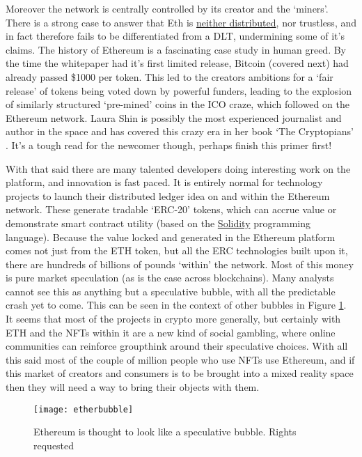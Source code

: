 Moreover the network is centrally controlled by its creator and the `miners'. There is a strong case to answer that Eth is \href{https://blog.mollywhite.net/blockchains-are-not-what-they-say/}{neither distributed}, nor trustless, and in fact therefore fails to be differentiated from a DLT, undermining some of it's claims. The history of Ethereum is a fascinating case study in human greed. By the time the whitepaper had it's first limited release, Bitcoin (covered next) had already passed \$1000 per token. This led to the creators ambitions for a `fair release' of tokens being voted down by powerful funders, leading to the explosion of similarly structured `pre-mined' coins in the ICO craze, which followed on the Ethereum network. Laura Shin is possibly the most experienced journalist and author in the space and has covered this crazy era in her book `The Cryptopians' \cite{cryptopians}. It's a tough read for the newcomer though, perhaps finish this primer first!\par
With that said there are many talented developers doing interesting work on the platform, and innovation is fast paced. It is entirely normal for technology projects to launch their distributed ledger idea on and within the Ethereum network. These generate tradable `ERC-20' tokens, which can accrue value or demonstrate smart contract utility  (based on the \href{https://soliditylang.org/}{Solidity} programming language). Because the value locked and generated in the Ethereum platform comes not just from the ETH token, but all the ERC technologies built upon it, there are hundreds of billions of pounds `within' the network. Most of this money is pure market speculation (as is the case across blockchains). Many analysts cannot see this as anything but a speculative bubble, with all the predictable crash yet to come. This can be seen in the context of other bubbles in Figure \ref{fig:etherbubble}. It seems that most of the projects in crypto more generally, but certainly with ETH and the NFTs within it are a new kind of social gambling, where online communities can reinforce groupthink around their speculative choices. With all this said most of the couple of million people who use NFTs use Ethereum, and if this market of creators and consumers is to be brought into a mixed reality space then they will need a way to bring their objects with them. 
\begin{figure}
  \centering
    \texttt{[image: etherbubble]}
  \caption{Ethereum is thought to look like a speculative bubble. Rights requested}
    \label{fig:etherbubble}
\end{figure}

